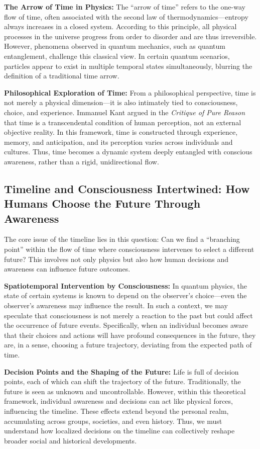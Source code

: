 \documentclass[12pt]{article}
\begin{document}
\textbf{The Arrow of Time in Physics:} The ``arrow of time'' refers to the one-way flow of time, often associated with the second law of thermodynamics—entropy always increases in a closed system. According to this principle, all physical processes in the universe progress from order to disorder and are thus irreversible. However, phenomena observed in quantum mechanics, such as quantum entanglement, challenge this classical view. In certain quantum scenarios, particles appear to exist in multiple temporal states simultaneously, blurring the definition of a traditional time arrow.

\textbf{Philosophical Exploration of Time:} From a philosophical perspective, time is not merely a physical dimension—it is also intimately tied to consciousness, choice, and experience. Immanuel Kant argued in the \textit{Critique of Pure Reason} that time is a transcendental condition of human perception, not an external objective reality. In this framework, time is constructed through experience, memory, and anticipation, and its perception varies across individuals and cultures. Thus, time becomes a dynamic system deeply entangled with conscious awareness, rather than a rigid, unidirectional flow.

\subsection{Timeline and Consciousness Intertwined: How Humans Choose the Future Through Awareness}

The core issue of the timeline lies in this question: Can we find a ``branching point'' within the flow of time where consciousness intervenes to select a different future? This involves not only physics but also how human decisions and awareness can influence future outcomes.

\textbf{Spatiotemporal Intervention by Consciousness:} In quantum physics, the state of certain systems is known to depend on the observer's choice—even the observer’s awareness may influence the result. In such a context, we may speculate that consciousness is not merely a reaction to the past but could affect the occurrence of future events. Specifically, when an individual becomes aware that their choices and actions will have profound consequences in the future, they are, in a sense, choosing a future trajectory, deviating from the expected path of time.

\textbf{Decision Points and the Shaping of the Future:} Life is full of decision points, each of which can shift the trajectory of the future. Traditionally, the future is seen as unknown and uncontrollable. However, within this theoretical framework, individual awareness and decisions can act like physical forces, influencing the timeline. These effects extend beyond the personal realm, accumulating across groups, societies, and even history. Thus, we must understand how localized decisions on the timeline can collectively reshape broader social and historical developments.
\end{document}
